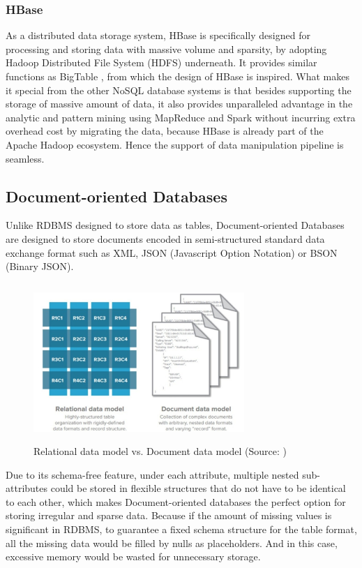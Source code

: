\subsubsection{HBase}\mbox{}\mbox{}

\noindent As a distributed data storage system, HBase is specifically designed for processing and storing data with massive volume and sparsity, by adopting Hadoop Distributed File System (HDFS) \cite{Vora2011HadoopHBaseFL}
underneath. It provides similar functions as BigTable \cite{Chang2006BigtableAD}, from which the design of HBase is inspired. What makes it special from the other NoSQL database systems is that besides supporting  the storage of massive amount of data, it also provides unparalleled advantage in the analytic and pattern mining using MapReduce and Spark  without incurring extra overhead cost by migrating the data, because HBase is already part of the Apache Hadoop ecosystem. Hence the support of data manipulation pipeline is seamless.

\subsection{Document-oriented Databases}

Unlike RDBMS designed to store data as tables, Document-oriented Databases are designed to store documents encoded in semi-structured standard \cite{DBLP:journals/corr/MoniruzzamanH13} data exchange
format such as XML, JSON (Javascript Option Notation) or BSON (Binary JSON).

\begin{figure}[H]
	\includegraphics[height=6cm, width=8cm]{../../../images/vs.png}
	\caption{Relational data model vs. Document data model (Source: \cite{DBLP:journals/corr/MoniruzzamanH13})}
\end{figure}


 \noindent Due to its schema-free feature, under each attribute, multiple nested sub-attributes could be stored in flexible structures that do not have to be identical to each other, which makes Document-oriented databases the perfect option for storing irregular and  sparse data. Because if the amount of missing values is significant in RDBMS, to guarantee a fixed schema structure for the table format, all the missing data would be filled by nulls as placeholders. And in this case, excessive memory would be wasted for unnecessary storage.  


